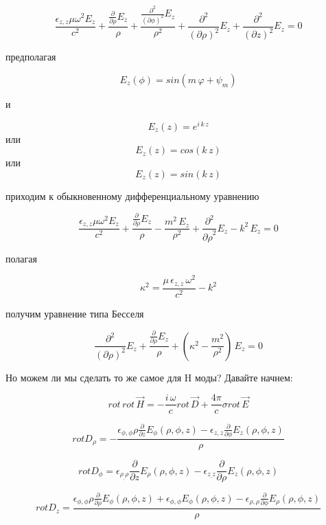 \documentclass{article}
\begin{document}
$$\frac{{\epsilon}_{z,z} \mu \omega^{2} E_{z}}{c^{2}} + \frac{\frac{\partial}{\partial {\rho}}E_{z}}{{\rho}} + \frac{\frac{\partial^{2}}{(\partial {\phi})^{2}}E_{z}}{{\rho}^{2}} + \frac{\partial^{2}}{(\partial {\rho})^{2}}E_{z} + \frac{\partial^{2}}{(\partial \mathit{z})^{2}}E_{z} = 0$$

предполагая

$$E_{z}(\phi) = sin(m\,\varphi + \psi_{m})$$

и

$$E_{z}(z) = e^{i\,k\,z}$$
или
$$E_{z}(z) = cos\left(k\,z\right)$$
или
$$E_{z}(z) = sin\left(k\,z\right)$$

приходим к обыкновенному дифференциальному уравнению

$$\frac{\epsilon_{z,z} \mu \omega^{2} E_{z}}{c^{2}} + \frac{\frac{\partial}{\partial {\rho}}E_{z}}{{\rho}} - \frac{m^{2}\,E_{z}}{{\rho}^{2}} + \frac{\partial^{2}}{{\partial {\rho}}^{2}}E_{z} - k^2\,E_{z} = 0$$

полагая

$$\kappa^2 = \frac{\mu \, {\epsilon}_{z,z} \, \omega^2}{c^2} - k^2$$

получим уравнение типа Бесселя

$$\frac{\partial^{2}}{(\partial {\rho})^{2}}E_{z} + \frac{\frac{\partial}{\partial {\rho}}E_{z}}{{\rho}} + \left(\kappa^2 - \frac{m^{2}}{{\rho}^{2}}\right)\,E_{z} = 0$$


Но можем ли мы сделать то же самое для H моды?
Давайте начнем:



$$rot\,rot\,\vec{H} = - \frac{i\,\omega}{c} rot\, \vec{D}  + \frac{4\pi}{c} \sigma rot\,\vec{E}$$


$$rot D_{\rho}=-\frac{{\epsilon}_{\phi,\phi} {\rho} \frac{\partial}{\partial \mathit{z}}E_{\phi}\left({\rho}, {\phi}, \mathit{z}\right) - {\epsilon}_{z,z} \frac{\partial}{\partial {\phi}}E_{z}\left({\rho}, {\phi}, \mathit{z}\right)}{{\rho}}$$

$$rot D_{\phi}={\epsilon}_{\rho_,\rho} \frac{\partial}{\partial \mathit{z}}E_{\rho}\left({\rho}, {\phi}, \mathit{z}\right) - \epsilon_{z_,z} \frac{\partial}{\partial {\rho}}E_{z}\left({\rho}, {\phi}, \mathit{z}\right)$$

$$rot D_{z}=\frac{{\epsilon}_{\phi,\phi} {\rho} \frac{\partial}{\partial {\rho}}E_{\phi}\left({\rho}, {\phi}, \mathit{z}\right) + \epsilon_{\phi,\phi} E_{\phi}\left({\rho}, {\phi}, \mathit{z}\right) - {\epsilon}_{\rho,\rho} \frac{\partial}{\partial {\phi}}E_{\rho}\left({\rho}, {\phi}, \mathit{z}\right)}{{\rho}}$$
\end{document}
